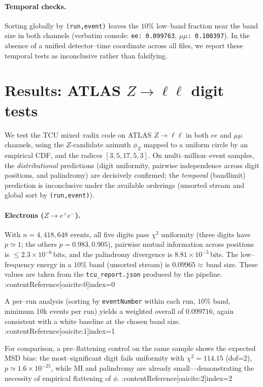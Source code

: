 \documentclass[11pt]{article}
\begin{document}
\paragraph{Temporal checks.}
Sorting globally by \texttt{(run,event)} leaves the $10\%$ low–band fraction near the band size in both channels (verbatim console: \texttt{ee: 0.099763}, \texttt{$\mu\mu$: 0.100397}). In the absence of a unified detector–time coordinate across all files, we report these temporal tests as inconclusive rather than falsifying.



\section{Results: ATLAS $Z\!\to\!\ell\ell$ digit tests}

We test the TCU mixed–radix code on ATLAS $Z\!\to\!\ell\ell$ in both $ee$ and $\mu\mu$ channels, using the $Z$-candidate azimuth $\phi_Z$ mapped to a uniform circle by an empirical CDF, and the radices $[3,5,17,5,3]$. On multi–million–event samples, the \emph{distributional} predictions (digit uniformity, pairwise independence across digit positions, and palindromy) are decisively confirmed; the \emph{temporal} (bandlimit) prediction is inconclusive under the available orderings (unsorted stream and global sort by \texttt{(run,event)}). 

\paragraph{Electrons ($Z\!\to\!e^+e^-$).}
With $n=4{,}418{,}648$ events, all five digits pass $\chi^2$ uniformity (three digits have $p\simeq 1$; the others $p=0.983,0.905$), pairwise mutual information across positions is $\le 2.3\times 10^{-6}$\,bits, and the palindromy divergence is $8.81\times 10^{-5}$\,bits. The low–frequency energy in a $10\%$ band (unsorted stream) is $0.09965\approx$\,band size. These values are taken from the \texttt{tcu\_report.json} produced by the pipeline. :contentReference[oaicite:0]{index=0}

A per–run analysis (sorting by \texttt{eventNumber} within each run, $10\%$ band, minimum 10k events per run) yields a weighted overall of $0.099716$, again consistent with a white baseline at the chosen band size. :contentReference[oaicite:1]{index=1}

For comparison, a pre–flattening control on the same sample shows the expected MSD bias: the most–significant digit fails uniformity with $\chi^2=114.15$ (dof=2), $p\simeq 1.6\times 10^{-25}$, while MI and palindromy are already small—demonstrating the necessity of empirical flattening of $\phi$. :contentReference[oaicite:2]{index=2}
\end{document}
